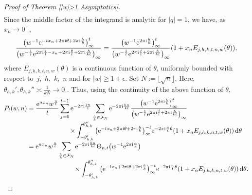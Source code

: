 \documentclass[pdftex]{sigma}
\numberwithin{equation}{section}
\begin{document}
\begin{proof}[Proof of Theorem \ref{|w|>1 Asymptotics}]
\begin{align*}
 \end{align*}
 Since the middle factor of the integrand is analytic for $|q|=1$, we have, as $x_n \to 0^+$,
 \begin{align}
 \frac{\big(w^{-1}{\rm e}^{-tx_n+2\pi {\rm i} \theta+2\pi {\rm i} \frac{h}{k}}\big)_{\infty}^t}{\big(w^{-\frac{1}{t}}{\rm e}^{2\pi {\rm i} \frac{j}{t}-x_n+2\pi {\rm i} \frac{\theta}{t}+2\pi {\rm i} \frac{h}{kt}}\big)_{\infty}} =\frac{\big(w^{-1}{\rm e}^{2\pi {\rm i} \frac{h}{k}}\big)_{\infty}^t}{\big(w^{-\frac{1}{t}}{\rm e}^{2\pi {\rm i} \frac{j}{t}+2\pi {\rm i} \frac{h}{kt}}\big)_{\infty}}(1+x_n E_{j,h,k,t,n,w}(\theta)), \label{E:Ejhktw}
 \end{align}
 where $E_{j,h,k,t,n,w}(\theta)$ is a continuous function of $\theta$, uniformly bounded with respect to~$j$,~$h$,~$k$,~$n$ and for $|w|\geq 1+\epsilon$. Set $N:=\lfloor \sqrt{n} \rfloor$.
 Here, $\theta_{h,k}',\theta_{h,k}'' \asymp \frac{1}{kN} \to 0$ \cite[p.~75]{Andrews}. Thus, using the continuity of the above function of $\theta$,
 \begin{align*}
 P_t(w,n)
 &{}=\frac{{\rm e}^{nx_n}w^{\frac{n}{t}}}{t}\sum_{j=0}^{ t-1}{\rm e}^{-2\pi {\rm i} \frac{jn}{t}} \sum_{\frac{h}{k} \in \mathcal{F}_N} {\rm e}^{-2\pi {\rm i} \frac{hn}{kt}}\frac{\big(w^{-1}{\rm e}^{2\pi {\rm i} \frac{h}{k}}\big)_{\infty}^t}{\big(w^{-\frac{1}{t}}{\rm e}^{2\pi {\rm i} \frac{j}{t}+2\pi {\rm i} \frac{h}{kt}}\big)_{\infty}} \\[-1mm]
 &\hphantom{=\frac{{\rm e}^{nx_n}w^{\frac{n}{t}}}{t}\sum_{j=0}^{ t-1}}\,{} \times \int_{-\theta_{h,k}'}^{\theta_{h,k}''} \big({\rm e}^{-tx_n+2\pi {\rm i} \theta+2\pi {\rm i} \frac{h}{k}}\big)_{\infty}^{-t}{\rm e}^{-2\pi {\rm i} \frac{n}{t} \theta}(1+x_n E_{j,h,k,n,t,w}(\theta)) \,{\rm d}\theta \\[-1mm]
 &{}={\rm e}^{nx_n}w^{\frac{n}{t}} \sum_{\frac{h}{k} \in \mathcal{F}_N} {\rm e}^{-2\pi {\rm i} \frac{hn}{kt}}\Theta_{n,t}\big(w^{-1}{\rm e}^{2\pi {\rm i} \frac{h}{k}}\big) \\[-1mm]
 &\hphantom{={\rm e}^{nx_n}w^{\frac{n}{t}} \sum_{\frac{h}{k} \in \mathcal{F}_N}}\,{} \times \int_{-\theta_{h,k}'}^{\theta_{h,k}''} \big({\rm e}^{-tx_n+2\pi {\rm i} \theta+2\pi {\rm i} \frac{h}{k}}\big)_{\infty}^{-t}{\rm e}^{-2\pi {\rm i} \frac{n}{t} \theta}(1+x_n E_{j,h,k,n,t,w}(\theta)) \,{\rm d}\theta.
 \end{align*}


\end{proof}
\end{document}

